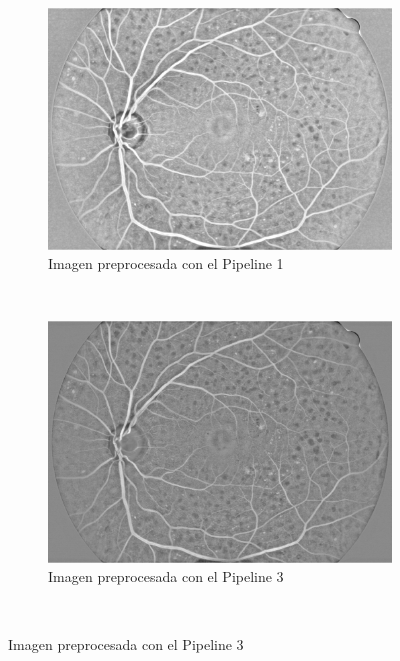 \begin{figure} [H] 
    \centering
    \begin{subfigure}[b]{0.3\textwidth}
        \includegraphics[width=\textwidth]{Figures/HRF/HRF_Pip1_01_dr_cropped}
        \caption{Imagen preprocesada con el Pipeline 1}
        \label{fig:gull}
    \end{subfigure}
    ~ %
    \begin{subfigure}[b]{0.3\textwidth}
        \includegraphics[width=\textwidth]{Figures/HRF/HRF_Pip3_01_dr_cropped}
        \caption{Imagen preprocesada con el Pipeline 3}
        \label{fig:tiger}
    \end{subfigure}
    ~ %

\end{figure}
